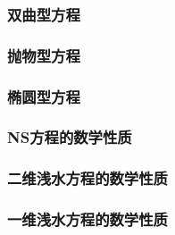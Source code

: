 \subsubsection{双曲型方程}

\subsubsection{抛物型方程}

\subsubsection{椭圆型方程}

\subsubsection{NS方程的数学性质}

\subsubsection{二维浅水方程的数学性质}

\subsubsection{一维浅水方程的数学性质}

